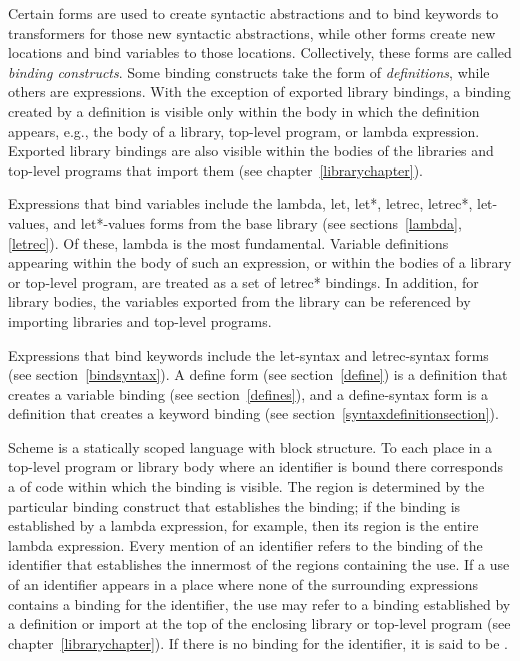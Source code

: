 Certain forms are used to create syntactic abstractions
and to bind keywords to transformers for those new syntactic abstractions, while other
forms create new locations and bind variables to those
locations.  Collectively, these forms are called {\em binding
  constructs}.
Some binding constructs take the form of
\textit{definitions}, while others are
expressions.
With the exception of exported library bindings, a binding created
by a definition is visible only within the body in which the
definition appears, e.g., the body of a library, top-level program,
or {\cf lambda} expression.
Exported library bindings are also visible within the bodies of
the libraries and top-level programs that import them (see
chapter~\ref{librarychapter}).

Expressions that bind variables include the {\cf lambda},
{\cf let}, {\cf let*}, {\cf letrec}, {\cf letrec*}, {\cf let-values},
and {\cf let*-values} forms from the base library (see
sections~\ref{lambda}, \ref{letrec}).
Of these, {\cf lambda} is the most fundamental.
Variable definitions appearing within the body of 
such an expression, or within the bodies of a library or top-level
program, are treated as a set of
{\cf letrec*} bindings.
In addition, for library bodies, 
the variables exported from the library can be referenced by
importing libraries and top-level programs.

Expressions that bind keywords include the {\cf
  let-syntax} and {\cf letrec-syntax} forms (see
section~\ref{bindsyntax}).  A {\cf define} form (see section~\ref{define}) is a
definition that creates a variable binding (see 
section~\ref{defines}), and a {\cf define-syntax} form is
a definition that creates a keyword binding (see
section~\ref{syntaxdefinitionsection}).

\vest Scheme is a statically scoped language with
block structure.  To each place in a top-level program or library body where an identifier is bound 
there corresponds a  of code within which
the binding is visible.  The region is determined by the particular
binding construct that establishes the binding; if the binding is
established by a {\cf lambda} expression, for example, then its region
is the entire {\cf lambda} expression.  Every mention of an identifier
refers to the binding of the identifier that establishes the
innermost of the regions containing the use.  If a use of an
identifier appears in a place where none of the surrounding expressions
contains a binding for the identifier, the use may refer to a
binding established by a definition or import at the top of the
enclosing library or top-level program
(see chapter~\ref{librarychapter}).
If there is no binding for the identifier,
it is said to be .

